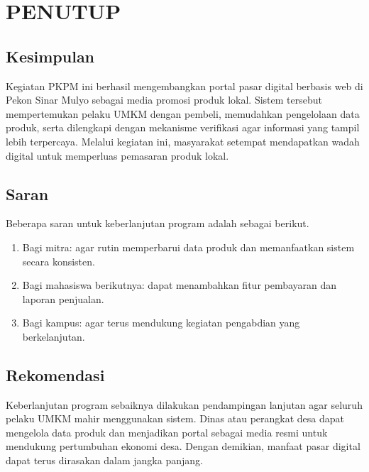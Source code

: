 \documentclass[12pt,a4paper]{article}
\begin{document}
\section{PENUTUP}

\subsection{Kesimpulan}

Kegiatan PKPM ini berhasil mengembangkan portal pasar digital
berbasis web di Pekon Sinar Mulyo sebagai media promosi produk
lokal. Sistem tersebut mempertemukan pelaku UMKM dengan pembeli,
memudahkan pengelolaan data produk, serta dilengkapi dengan
mekanisme verifikasi agar informasi yang tampil lebih terpercaya.
Melalui kegiatan ini, masyarakat setempat mendapatkan wadah digital
untuk memperluas pemasaran produk lokal.

\subsection{Saran}

Beberapa saran untuk keberlanjutan program adalah sebagai berikut.

\begin{enumerate}[
    leftmargin=1.25cm,
    label=\arabic*.,
    itemsep=0pt,
    topsep=0.2cm
]

    \item Bagi mitra: agar rutin memperbarui data produk dan
    memanfaatkan sistem secara konsisten.

    \item Bagi mahasiswa berikutnya: dapat menambahkan fitur
    pembayaran dan laporan penjualan.

    \item Bagi kampus: agar terus mendukung kegiatan pengabdian yang
    berkelanjutan.

\end{enumerate}

\subsection{Rekomendasi}

Keberlanjutan program sebaiknya dilakukan pendampingan lanjutan agar
seluruh pelaku UMKM mahir menggunakan sistem. Dinas atau perangkat
desa dapat mengelola data produk dan menjadikan portal sebagai media
resmi untuk mendukung pertumbuhan ekonomi desa. Dengan demikian,
manfaat pasar digital dapat terus dirasakan dalam jangka panjang.
\end{document}
